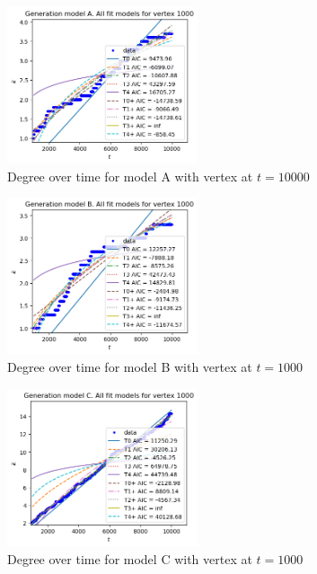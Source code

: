 \documentclass[a4paper]{article}
\begin{document}
%
\begin{figure}[H]
    \centering
		\includegraphics[width=0.5\textwidth]{modelA/all_dt1000.png}
		\caption{Degree over time for model A with vertex at $t=10000$}
\end{figure}
%
\begin{figure}[H]
    \centering
		\includegraphics[width=0.5\textwidth]{modelB/all_dt1000.png}
		\caption{Degree over time for model B with vertex at $t=1000$}
\end{figure}
%
\begin{figure}[H]
		\centering
		\includegraphics[width=0.5\textwidth]{modelC/all_dt1000.png}
		\caption{Degree over time for model C with vertex at $t=1000$}
		\label{fig:allC_dt1000}
\end{figure}
\end{document}
